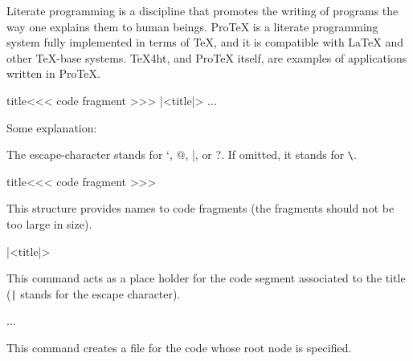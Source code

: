 Literate programming is a discipline that promotes the writing of programs the
way one explains them to human beings. ProTeX is a literate programming system
fully implemented in terms of TeX, and it is compatible with LaTeX and other
TeX-base systems. TeX4ht, and ProTeX itself, are examples of applications
written in ProTeX.


\begin{texsource}

\<title\><<<
code fragment
>>>  
|<title|>
\OutputCode\<...\> 
\end{texsource}

Some explanation:

\begin{texsource}

\end{texsource}

The escape-character stands for `, @, |, or ?. If omitted, it stands for \verb|\|. 

\begin{texsource}
\<title\><<<
code fragment
>>>

\end{texsource}

This structure provides names to code fragments (the fragments should not be too large in size).


\begin{texsource}
 |<title|>
 \end{texsource}

 This command acts as a place holder for the code segment associated to the title (\texttt{|} stands for the escape character). 

\begin{texsource}
   \OutputCode\<...\>
 \end{texsource}

This command creates a file for the code whose root node is specified.



